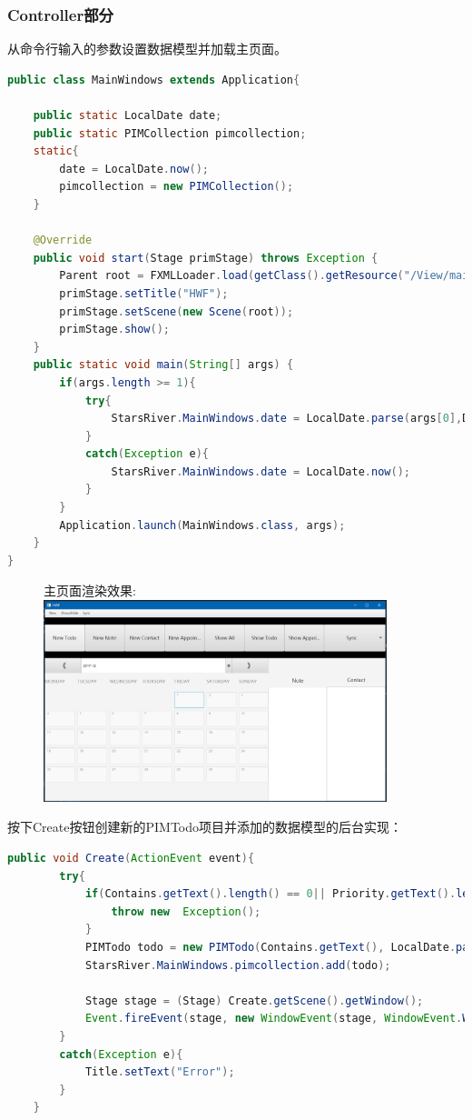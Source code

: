 \documentclass[a4paper]{article}
\begin{document}
\subsubsection{Controller部分}
    从命令行输入的参数设置数据模型并加载主页面。
    \begin{lstlisting}[language=Java]
public class MainWindows extends Application{

    public static LocalDate date;
    public static PIMCollection pimcollection;
    static{
        date = LocalDate.now();
        pimcollection = new PIMCollection();
    }

    @Override
    public void start(Stage primStage) throws Exception {
        Parent root = FXMLLoader.load(getClass().getResource("/View/main.fxml"));
        primStage.setTitle("HWF");
        primStage.setScene(new Scene(root));
        primStage.show();
    }
    public static void main(String[] args) {
        if(args.length >= 1){
            try{
                StarsRiver.MainWindows.date = LocalDate.parse(args[0],DateTimeFormatter.ofPattern("yyyy-MM-dd"));
            }
            catch(Exception e){
                StarsRiver.MainWindows.date = LocalDate.now();
            }
        }
        Application.launch(MainWindows.class, args);
    }
}
    \end{lstlisting}
        \begin{figure}[H]
            主页面渲染效果:\\
            \centering
            \includegraphics[width=10cm]{mainview.png}\\
        \end{figure}
    按下Create按钮创建新的PIMTodo项目并添加的数据模型的后台实现：
    \begin{lstlisting}[language=Java]
    public void Create(ActionEvent event){
        try{
            if(Contains.getText().length() == 0|| Priority.getText().length() == 0){
                throw new  Exception();
            }
            PIMTodo todo = new PIMTodo(Contains.getText(), LocalDate.parse(Year.getText()+Month.getText()+Day.getText(),DateTimeFormatter.ofPattern("yyyyMMdd")), Priority.getText());
            StarsRiver.MainWindows.pimcollection.add(todo);

            Stage stage = (Stage) Create.getScene().getWindow();
            Event.fireEvent(stage, new WindowEvent(stage, WindowEvent.WINDOW_CLOSE_REQUEST ));
        }
        catch(Exception e){
            Title.setText("Error");
        }
    }
    \end{lstlisting}
\end{document}
